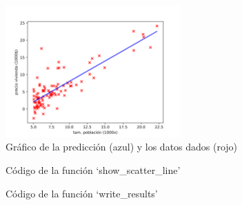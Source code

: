 \documentclass[6pt]{AiTex}
\begin{document}
\begin{figure}[H]
    \centering
    \includegraphics[width=0.6\textwidth]{imagenes/scatter.png}
    \caption{Gráfico de la predicción (azul) y los datos dados (rojo)}
    \label{fig:scatter}
\end{figure}

\begin{figure}[H]
    \centering
    
    \caption{Código de la función `show\_scatter\_line'}
    \label{fig:show_scatter_line}
\end{figure}

\begin{figure}[H]
    \centering
    
    \caption{Código de la función `write\_results'}
    \label{fig:write_results}
\end{figure}
\end{document}
